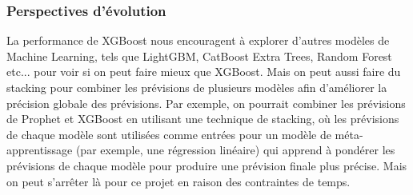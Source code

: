 \documentclass[a4paper,12pt]{report}
\theoremstyle{definition}
\begin{document}
	\subsubsection{Perspectives d’évolution}
	La performance de XGBoost nous encouragent à explorer d'autres modèles de Machine Learning, tels que LightGBM, CatBoost	Extra Trees, Random Forest etc... pour voir si on peut faire mieux que XGBoost. Mais on peut aussi faire du stacking pour combiner les prévisions de plusieurs modèles afin d'améliorer la précision globale des prévisions. Par exemple, on pourrait combiner les prévisions de Prophet et XGBoost en utilisant une technique de stacking, où les prévisions de chaque modèle sont utilisées comme entrées pour un modèle de méta-apprentissage (par exemple, une régression linéaire) qui apprend à pondérer les prévisions de chaque modèle pour produire une prévision finale plus précise. Mais on peut s'arrêter là pour ce projet en raison des contraintes de temps.
\end{document}
